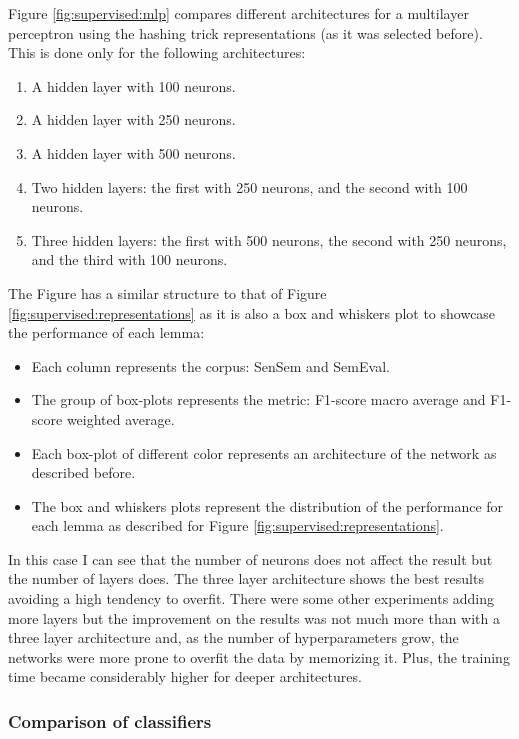 Figure \ref{fig:supervised:mlp} compares different architectures
for a multilayer perceptron using the hashing trick representations (as it was
selected before). This is done only for the following architectures:

\begin{enumerate}
  \item A hidden layer with 100 neurons.
  \item A hidden layer with 250 neurons.
  \item A hidden layer with 500 neurons.
  \item Two hidden layers: the first with 250 neurons, and the second with 100
    neurons.
  \item Three hidden layers: the first with 500 neurons, the second with 250
    neurons, and the third with 100 neurons.
\end{enumerate}

The Figure has a similar structure to that of Figure
\ref{fig:supervised:representations} as it is also a box and whiskers plot
to showcase the performance of each lemma:

\begin{itemize}
  \item Each column represents the corpus: SenSem and SemEval.
  \item The group of box-plots represents the metric: F1-score macro average
    and F1-score weighted average.
  \item Each box-plot of different color represents an architecture of the
    network as described before.
  \item The box and whiskers plots represent the distribution of the
    performance for each lemma as described for Figure
    \ref{fig:supervised:representations}.
\end{itemize}

In this case I can see that the number of neurons does not affect the result
but the number of layers does. The three layer architecture shows the best
results avoiding a high tendency to overfit. There were some other experiments
adding more layers but the improvement on the results was not much more than
with a three layer architecture and, as the number of hyperparameters grow, the
networks were more prone to overfit the data by memorizing it. Plus, the
training time became considerably higher for deeper architectures.

\subsubsection{Comparison of
classifiers}\label{sec:supervised:classifier:comparison}

